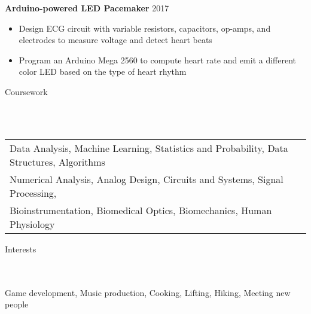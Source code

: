 \documentclass[a4paper]{article}
\newcommand{\lineunder} {
    \vspace*{-8pt} \\
    \hspace*{-18pt} \hrulefill \\
}
\newcommand{\header} [1] {
    {\hspace*{-18pt}\vspace*{6pt} \Large{#1} }
    \vspace*{-6pt} 
    \lineunder
}
\begin{document}
\textbf{Arduino-powered LED Pacemaker} \hfill 2017
\vspace{-2mm}
\begin{itemize} \itemsep 0.1pt
	\item Design ECG circuit with variable resistors, capacitors, op-amps, and electrodes to measure voltage and detect heart beats
	\item Program an Arduino Mega 2560 to compute heart rate and emit a different color LED based on the type of heart rhythm
\end{itemize}
\vspace*{2mm}

\header{Coursework}
\begin{tabular}{ l l }
	Data Analysis, Machine Learning, Statistics and Probability, Data Structures, Algorithms \\
	Numerical Analysis, Analog Design, Circuits and Systems, Signal Processing, \\
	Bioinstrumentation,
	Biomedical Optics, Biomechanics, Human Physiology
\end{tabular}
\vspace{2mm}

\header{Interests}
Game development, Music production, Cooking, Lifting, Hiking, Meeting new people
\ 
\end{document}
